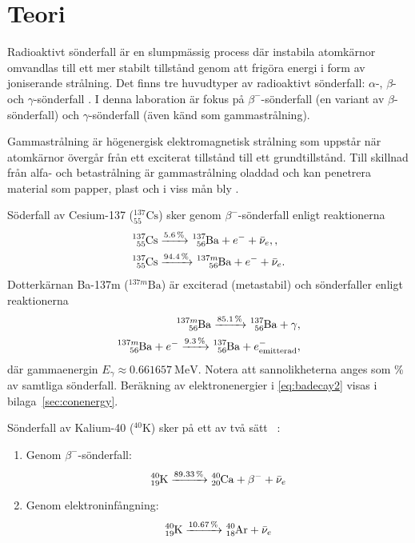 \section{Teori} \label{sec:theory}

Radioaktivt sönderfall är en slumpmässig process där instabila atomkärnor
omvandlas till ett mer stabilt tillstånd genom att frigöra energi i form av
joniserande strålning. Det finns tre huvudtyper av radioaktivt sönderfall:
$\alpha$-, $\beta$- och $\gamma$-sönderfall \parencite{yf}. I denna laboration
är fokus på $\beta^-$-sönderfall (en variant av $\beta$-sönderfall) och
$\gamma$-sönderfall (även känd som gammastrålning).

Gammastrålning är högenergisk elektromagnetisk strålning som uppstår när
atomkärnor övergår från ett exciterat tillstånd till ett grundtillstånd. Till
skillnad från alfa- och betastrålning är gammastrålning oladdad och kan
penetrera material som papper, plast och i viss mån bly
\parencite{spectrometry}.

Söderfall av Cesium-137 ($^{137}_{55}\text{Cs}$) sker genom
$\beta^-$-sönderfall enligt reaktionerna
%
\begin{align}
    \ce{^137_55Cs} &\xrightarrow{\qty{5.6}{\percent}}  \ce{^137_56Ba} + e^- + \bar{\nu}_e,   \label{eq:csdecay1}, \\
    \ce{^137_55Cs} &\xrightarrow{\qty{94.4}{\percent}} \ce{^{137m}_56Ba} + e^- + \bar{\nu}_e \label{eq:csdecay2}.
\end{align}
%
Dotterkärnan Ba-137m ($^{137m}\text{Ba}$) är exciterad (metastabil) och
sönderfaller enligt reaktionerna
%
\begin{align}
    \ce{^{137m}_56Ba} \xrightarrow{\qty{85.1}{\percent}} \ce{^137_56Ba} + \gamma                     \label{eq:badecay1}, \\
    \ce{^{137m}_56Ba} + e^- \xrightarrow{\qty{9.3}{\percent}} \ce{^137_56Ba} + e^-_\text{emitterad} \label{eq:badecay2},
\end{align}
%
där gammaenergin $E_\gamma \approx \qty{0.661657}{\MeV}$. Notera att
sannolikheterna anges som \unit{\percent} av samtliga sönderfall. Beräkning
av elektronenergier i \eqref{eq:badecay2} visas i bilaga~\ref{sec:conenergy}.

Sönderfall av Kalium-40 ($^{40}\text{K}$) sker på ett av två sätt
\parencite{nuclear}~\parencite{instructions}:
%
\begin{enumerate}
    \item Genom $\beta^-$-sönderfall:
    \begin{equation}
        \ce{^40_19K} \xrightarrow{\qty{89.33}{\percent}} \ce{^40_20Ca} + \beta^- + \bar{\nu}_e \label{eq:kdecay1}
    \end{equation}

    \item Genom elektroninfångning:
    \begin{equation}
        \ce{^40_19K} \xrightarrow{\qty{10.67}{\percent}} \ce{^40_18Ar} + \bar{\nu}_e           \label{eq:kdecay2}
    \end{equation}
\end{enumerate}

